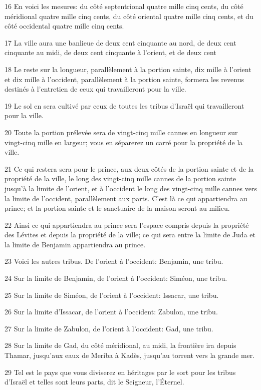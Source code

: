 \par 16 En voici les mesures: du côté septentrional quatre mille cinq cents, du côté méridional quatre mille cinq cents, du côté oriental quatre mille cinq cents, et du côté occidental quatre mille cinq cents.
\par 17 La ville aura une banlieue de deux cent cinquante au nord, de deux cent cinquante au midi, de deux cent cinquante à l'orient, et de deux cent
\par 18 Le reste sur la longueur, parallèlement à la portion sainte, dix mille à l'orient et dix mille à l'occident, parallèlement à la portion sainte, formera les revenus destinés à l'entretien de ceux qui travailleront pour la ville.
\par 19 Le sol en sera cultivé par ceux de toutes les tribus d'Israël qui travailleront pour la ville.
\par 20 Toute la portion prélevée sera de vingt-cinq mille cannes en longueur sur vingt-cinq mille en largeur; vous en séparerez un carré pour la propriété de la ville.
\par 21 Ce qui restera sera pour le prince, aux deux côtés de la portion sainte et de la propriété de la ville, le long des vingt-cinq mille cannes de la portion sainte jusqu'à la limite de l'orient, et à l'occident le long des vingt-cinq mille cannes vers la limite de l'occident, parallèlement aux parts. C'est là ce qui appartiendra au prince; et la portion sainte et le sanctuaire de la maison seront au milieu.
\par 22 Ainsi ce qui appartiendra au prince sera l'espace compris depuis la propriété des Lévites et depuis la propriété de la ville; ce qui sera entre la limite de Juda et la limite de Benjamin appartiendra au prince.
\par 23 Voici les autres tribus. De l'orient à l'occident: Benjamin, une tribu.
\par 24 Sur la limite de Benjamin, de l'orient à l'occident: Siméon, une tribu.
\par 25 Sur la limite de Siméon, de l'orient à l'occident: Issacar, une tribu.
\par 26 Sur la limite d'Issacar, de l'orient à l'occident: Zabulon, une tribu.
\par 27 Sur la limite de Zabulon, de l'orient à l'occident: Gad, une tribu.
\par 28 Sur la limite de Gad, du côté méridional, au midi, la frontière ira depuis Thamar, jusqu'aux eaux de Meriba à Kadès, jusqu'au torrent vers la grande mer.
\par 29 Tel est le pays que vous diviserez en héritages par le sort pour les tribus d'Israël et telles sont leurs parts, dit le Seigneur, l'Éternel.
